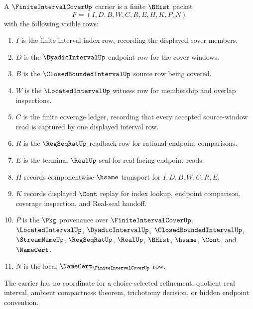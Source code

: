 \begin{definition}
\label{def:finite-interval-cover-carrier}
A $\FiniteIntervalCoverUp$ carrier is a finite $\BHist$ packet
$$
F=(I,D,B,W,C,R,E,H,K,P,N)
$$
with the following visible rows:
\begin{enumerate}
\item $I$ is the finite interval-index row, recording the displayed cover members.
\item $D$ is the $\DyadicIntervalUp$ endpoint row for the cover windows.
\item $B$ is the $\ClosedBoundedIntervalUp$ source row being covered.
\item $W$ is the $\LocatedIntervalUp$ witness row for membership and overlap inspections.
\item $C$ is the finite coverage ledger, recording that every accepted source-window read is captured by one displayed interval row.
\item $R$ is the $\RegSeqRatUp$ readback row for rational endpoint comparisons.
\item $E$ is the terminal $\RealUp$ seal for real-facing endpoint reads.
\item $H$ records componentwise $\hsame$ transport for $I,D,B,W,C,R,E$.
\item $K$ records displayed $\Cont$ replay for index lookup, endpoint comparison, coverage inspection, and Real-seal handoff.
\item $P$ is the $\Pkg$ provenance over $\FiniteIntervalCoverUp$, $\LocatedIntervalUp$, $\DyadicIntervalUp$, $\ClosedBoundedIntervalUp$, $\StreamNameUp$, $\RegSeqRatUp$, $\RealUp$, $\BHist$, $\hsame$, $\Cont$, and $\NameCert$.
\item $N$ is the local $\NameCert_{\FiniteIntervalCoverUp}$ row.
\end{enumerate}
The carrier has no coordinate for a choice-selected refinement, quotient real interval, ambient compactness theorem, trichotomy decision, or hidden endpoint convention.
\end{definition}

